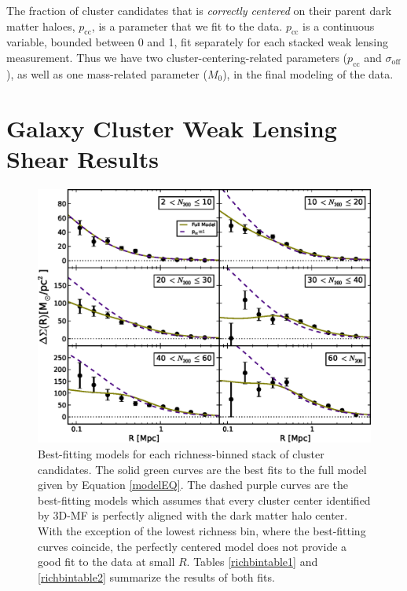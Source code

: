 The fraction of cluster candidates that is {\it correctly centered} on their parent dark matter haloes, $p_{\mathrm{cc}}$, is a parameter that we fit to the data. $p_{\mathrm{cc}}$ is a continuous variable, bounded between 0 and 1, fit separately for each stacked weak lensing measurement. Thus we have two cluster-centering-related parameters ($p_{\mathrm{cc}}$ and $\sigma_{\mathrm{off}}$), as well as one mass-related parameter ($M_0$), in the final modeling of the data.



\section{Galaxy Cluster Weak Lensing Shear Results}
\label{sec:results}

\begin{figure}
\begin{center}
  \includegraphics[scale=0.9]{plots_ch4/shearFit_panel_fcc0and1_slopeMN1p5_DuttonMaccio.eps}
  \caption[Shear for Richness-Binned Clusters]{Best-fitting models for each richness-binned stack of cluster candidates. The solid green curves are the best fits to the full model given by Equation \ref{modelEQ}. The dashed purple curves are the best-fitting models which assumes that every cluster center identified by \ac{3D-MF} is perfectly aligned with the dark matter halo center. With the exception of the lowest richness bin, where the best-fitting curves coincide, the perfectly centered model does not provide a good fit to the data at small $R$. Tables \ref{richbintable1} and \ref{richbintable2} summarize the results of both fits.}
\label{plot:nbinned}
\end{center}
\end{figure}

